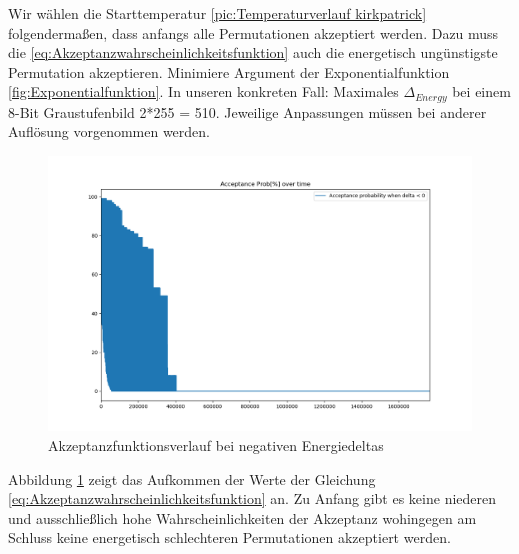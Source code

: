Wir wählen die Starttemperatur \ref{pic:Temperaturverlauf kirkpatrick} folgendermaßen, dass anfangs alle Permutationen 
akzeptiert werden. Dazu muss die \ref{eq:Akzeptanzwahrscheinlichkeitsfunktion} auch die energetisch ungünstigste Permutation 
akzeptieren. Minimiere Argument der Exponentialfunktion \ref{fig:Exponentialfunktion}.
In unseren konkreten Fall: Maximales $\Delta_{Energy}$ bei einem 8-Bit Graustufenbild 2*255 = 510. Jeweilige Anpassungen müssen 
bei anderer Auflösung vorgenommen werden.

\begin{figure}[H]
    \centering
    \includegraphics[width=\linewidth]{content/simulatedAnnealing/Bilder/Acceptance_Probabilities_over_time_1765297_steps_KirkpatrickCooldownSchedule.png}
    \caption{Akzeptanzfunktionsverlauf bei negativen Energiedeltas}
    \label{pic:Akzeptanzfunktionsverlauf kirkpatrick}
\end{figure}

Abbildung \ref{pic:Akzeptanzfunktionsverlauf kirkpatrick} zeigt das Aufkommen der Werte der Gleichung
\ref{eq:Akzeptanzwahrscheinlichkeitsfunktion} an. Zu Anfang gibt es keine niederen und ausschließlich 
hohe Wahrscheinlichkeiten der Akzeptanz wohingegen am Schluss keine energetisch schlechteren Permutationen 
akzeptiert werden.

